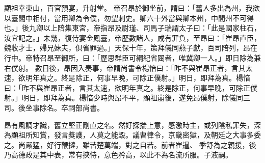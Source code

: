 \begin{pinyinscope}
 顯祖幸東山，百官預宴，升射堂。
 帝召昂於御坐前，謂曰：「舊人多出為州，我欲以臺閣中相付，當用卿為令僕，勿望刺史。卿六十外當與卿本州，中間州不可得也。」後九卿以上陪集東宮，帝指昂及尉瑾、司馬子瑞謂太子曰：「此是國家柱石，汝宜記之。」未幾，復侍宴金鳳臺，帝歷數諸人，咸有罪負，至昂曰：「崔昂直臣，魏收才士，婦兄妹夫，俱省罪過。」天保十年，策拜儀同燕子獻，百司陪列，昂在行中。帝特召昂至御所，曰：「歷思群臣可綱紀省闥者，唯冀卿一人。」即日除為兼右僕射。
 數日後，昂因入奏事，帝謂尚書令楊愔曰：「昨不與崔昂正者，言其太速，欲明年真之。終是除正，何事早晚，可除正僕射。」明日，即拜為真。楊愔曰：「昨不與崔昂正者，言其太速，欲明年真之。終是除正，何事早晚，可除正僕射。」明日，即拜為真。楊愔少時與昂不平，顯祖崩後，遂免昂僕射，除儀同三司。後坐事除名。卒祠部尚書。



 昂有風調才識，舊立堅正剛直之名。然好探揣上意，感激時主，或列陰私罪失，深為顯祖所知賞，發言獎護，人莫之能毀。議曹律令，京畿密獄，及朝廷之大事多委之。尚嚴猛，好行鞭撻，雖苦楚萬端，對之自若。前者崔暹、
 季舒為之親援，後乃高德政是其中表，常有挾恃，意色矜高，以此不為名流所服。子液嗣。



\end{pinyinscope}